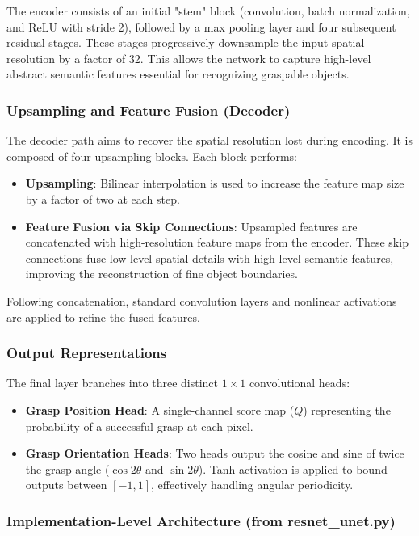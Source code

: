 The encoder consists of an initial "stem" block (convolution, batch normalization, and ReLU with stride 2), followed by a max pooling layer and four subsequent residual stages. These stages progressively downsample the input spatial resolution by a factor of 32. This allows the network to capture high-level abstract semantic features essential for recognizing graspable objects.

\subsubsection{Upsampling and Feature Fusion (Decoder)}
The decoder path aims to recover the spatial resolution lost during encoding. It is composed of four upsampling blocks. Each block performs:
\begin{itemize}
    \item \textbf{Upsampling}: Bilinear interpolation is used to increase the feature map size by a factor of two at each step.
    \item \textbf{Feature Fusion via Skip Connections}: Upsampled features are concatenated with high-resolution feature maps from the encoder. These skip connections fuse low-level spatial details with high-level semantic features, improving the reconstruction of fine object boundaries.
\end{itemize}
Following concatenation, standard convolution layers and nonlinear activations are applied to refine the fused features.

\subsubsection{Output Representations}
The final layer branches into three distinct $1 \times 1$ convolutional heads:
\begin{itemize}
    \item \textbf{Grasp Position Head}: A single-channel score map ($Q$) representing the probability of a successful grasp at each pixel.
    \item \textbf{Grasp Orientation Heads}: Two heads output the cosine and sine of twice the grasp angle ($\cos 2\theta$ and $\sin 2\theta$). Tanh activation is applied to bound outputs between $[-1, 1]$, effectively handling angular periodicity.
\end{itemize}

\subsubsection{Implementation-Level Architecture (from resnet\_unet.py)}

